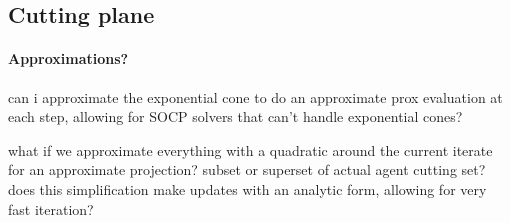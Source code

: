 \documentclass[12pt]{article}
\begin{document}
\subsection{Cutting plane}
\paragraph{Approximations?}
can i approximate the exponential cone to do an approximate prox evaluation
at each step, allowing for SOCP solvers that can't handle exponential cones?

what if we approximate everything with a quadratic around the current iterate
for an approximate projection? subset or superset of actual agent cutting set?
does this simplification make updates with an analytic form, allowing for very
fast iteration?



\newpage


\end{document}
